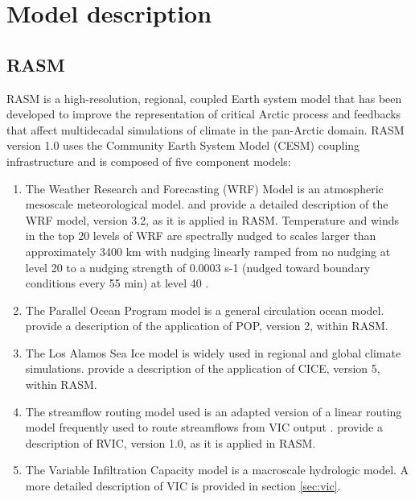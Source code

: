 \section{Model description}
\label{sec:models_ch3}

\subsection{RASM}

RASM is a high-resolution, regional, coupled Earth system model that has been developed to improve the representation of critical Arctic process and feedbacks that affect multidecadal simulations of climate in the pan-Arctic domain.
RASM version 1.0 uses the Community Earth System Model (CESM) coupling infrastructure \citep[CPL7; ][]{Craig_2012,Roberts_2015a} and is composed of five component models:

\begin{enumerate}
  \item The Weather Research and Forecasting (WRF) Model \citep{Skamarock_2008} is an atmospheric mesoscale meteorological model. \citet{DuVivier_2016} and \citet{Cassano_2016} provide a detailed description of the WRF model, version 3.2, as it is applied in RASM. Temperature and winds in the top 20 levels of WRF are spectrally nudged to scales larger than approximately 3400 km with nudging linearly ramped from no nudging at level 20 to a nudging strength of 0.0003 s-1 (nudged toward boundary conditions every 55 min) at level 40 \citep{Glisan_2013,Skamarock_2008}.
  \item The Parallel Ocean Program model \citep[POP; ][]{Smith_2010} is a general circulation ocean model. \citet{Roberts_2015a} provide a description of the application of POP, version 2, within RASM.
  \item The Los Alamos Sea Ice model \citep[CICE; ]{Hunke2015} is widely used in regional and global climate simulations. \citet{Roberts_2015a} provide a description of the application of CICE, version 5, within RASM.
  \item The streamflow routing model used is an adapted version of a linear routing model frequently used to route streamflows from VIC output \citep[RVIC; ][]{Lohmann_1996,Lohmann_1998b}. \citet{Hamman_2016b} provide a description of RVIC, version 1.0, as it is applied in RASM.
  \item The Variable Infiltration Capacity model \citep[VIC; ][]{Liang_1994,Liang_1996} is a macroscale hydrologic model. A more detailed description of VIC is provided in section \ref{sec:vic}.
\end{enumerate}

